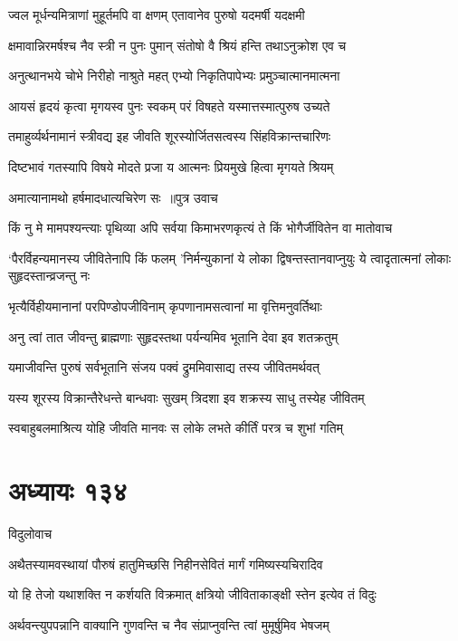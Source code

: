 \twolineshloka
{ज्वल मूर्धन्यमित्राणां मुहूर्तमपि वा क्षणम्}
{एतावानेव पुरुषो यदमर्षी यदक्षमी}


\twolineshloka
{क्षमावान्निरमर्षश्च नैव स्त्री न पुनः पुमान्}
{संतोषो वै श्रियं हन्ति तथाऽनुक्रोश एव च}


\twolineshloka
{अनुत्थानभये चोभे निरीहो नाश्रुते महत्}
{एभ्यो निकृतिपापेभ्यः प्रमुञ्चात्मानमात्मना}


\twolineshloka
{आयसं हृदयं कृत्वा मृगयस्व पुनः स्वकम्}
{परं विषहते यस्मात्तस्मात्पुरुष उच्यते}


\twolineshloka
{तमाहुर्व्यर्थनामानं स्त्रीवद्य इह जीवति}
{शूरस्योर्जितसत्वस्य सिंहविक्रान्तचारिणः}


\twolineshloka
{दिष्टभावं गतस्यापि विषये मोदते प्रजा}
{य आत्मनः प्रियमुखे हित्वा मृगयते श्रियम्}


\twolineshloka
{अमात्यानामथो हर्षमादधात्यचिरेण सः ॥पुत्र उवाच}
{}


\fourlineindentedshloka
{किं नु मे मामपश्यन्त्याः पृथिव्या अपि सर्वया}
{किमाभरणकृत्यं ते किं भोगैर्जीवितेन वा}
{मातोवाच}
{}


\threelineshloka
{`पैरर्विहन्यमानस्य जीवितेनापि किं फलम्}
{'निर्मन्युकानां ये लोका द्विषन्तस्तानवाप्नुयुः}
{ये त्वादृतात्मनां लोकाः सुहृदस्तान्व्रजन्तु नः}


\twolineshloka
{भृत्यैर्विहीयमानानां परपिण्डोपजीविनाम्}
{कृपणानामसत्वानां मा वृत्तिमनुवर्तिथाः}


\twolineshloka
{अनु त्वां तात जीवन्तु ब्राह्मणाः सुहृदस्तथा}
{पर्यन्यमिव भूतानि देवा इव शतक्रतुम्}


\twolineshloka
{यमाजीवन्ति पुरुषं सर्वभूतानि संजय}
{पक्वं द्रुममिवासाद्य तस्य जीवितमर्थवत्}


\twolineshloka
{यस्य शूरस्य विक्रान्तैरेधन्ते बान्धवाः सुखम्}
{त्रिदशा इव शक्रस्य साधु तस्येह जीवितम्}


\twolineshloka
{स्वबाहुबलमाश्रित्य योहि जीवति मानवः}
{स लोके लभते कीर्तिं परत्र च शुभां गतिम्}


\chapter{अध्यायः १३४}
\twolineshloka
{विदुलोवाच}
{}


\twolineshloka
{अथैतस्यामवस्थायां पौरुषं हातुमिच्छसि}
{निहीनसेवितं मार्गं गमिष्यस्यचिरादिव}


\twolineshloka
{यो हि तेजो यथाशक्ति न कर्शयति विक्रमात्}
{क्षत्रियो जीविताकाङ्क्षी स्तेन इत्येव तं विदुः}


\twolineshloka
{अर्थवन्त्युपपन्नानि वाक्यानि गुणवन्ति च}
{नैव संप्राप्नुवन्ति त्वां मुमूर्षुमिव भेषजम्}


